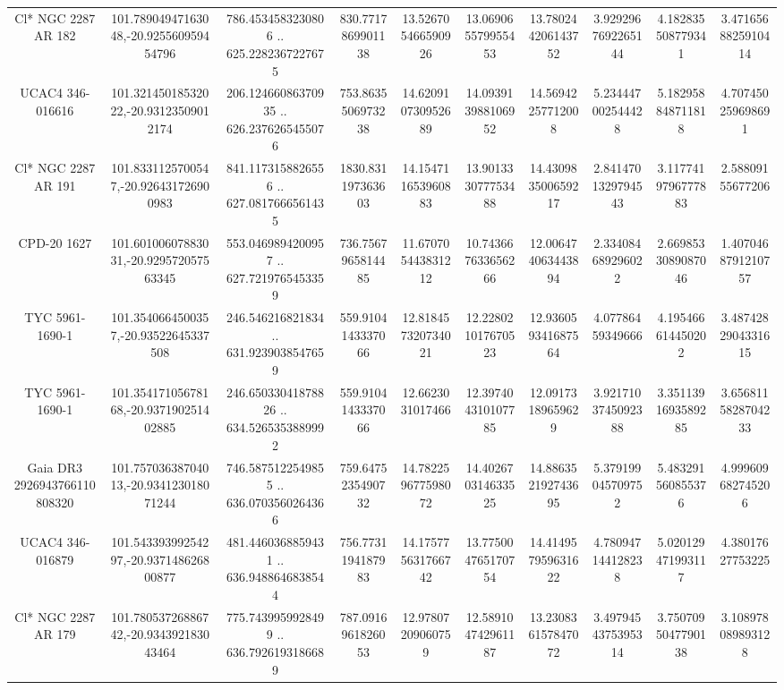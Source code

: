 \begin{table}
\begin{tabular}{cccccccccc}
Cl* NGC 2287     AR     182 & 101.78904947163048,-20.925560959454796 & 786.4534583230806 .. 625.2282367227675 & 830.7717869901138 & 13.526705466590926 & 13.069065579955453 & 13.780244206143752 & 3.9292967692265144 & 4.182835508779341 & 3.4716568825910414 \\
UCAC4 346-016616 & 101.32145018532022,-20.93123509012174 & 206.12466086370935 .. 626.2376265455076 & 753.8635506973238 & 14.620910730952689 & 14.093913988106952 & 14.56942257712008 & 5.234447002544428 & 5.182958848711818 & 4.707450259698691 \\
Cl* NGC 2287     AR     191 & 101.8331125700547,-20.926431726900983 & 841.1173158826556 .. 627.0817666561435 & 1830.831197363603 & 14.154711653960883 & 13.901333077753488 & 14.430983500659217 & 2.8414701329794543 & 3.1177419796777883 & 2.58809155677206 \\
CPD-20  1627 & 101.60100607883031,-20.929572057563345 & 553.0469894200957 .. 627.7219765453359 & 736.7567965814485 & 11.670705443831212 & 10.743667633656266 & 12.006474063443894 & 2.334084689296022 & 2.6698533089087046 & 1.4070468791210757 \\
TYC 5961-1690-1 & 101.3540664500357,-20.93522645337508 & 246.546216821834 .. 631.9239038547659 & 559.9104143337066 & 12.818457320734021 & 12.228021017670523 & 12.936059341687564 & 4.07786459349666 & 4.195466614450202 & 3.4874282904331615 \\
TYC 5961-1690-1 & 101.35417105678168,-20.937190251402885 & 246.65033041878826 .. 634.5265353889992 & 559.9104143337066 & 12.6623031017466 & 12.397404310107785 & 12.09173189659629 & 3.9217103745092388 & 3.3511391693589285 & 3.6568115828704233 \\
Gaia DR3 2926943766110808320 & 101.75703638704013,-20.934123018071244 & 746.5875122549855 .. 636.0703560264366 & 759.6475235490732 & 14.782259677598072 & 14.402670314633525 & 14.886352192743695 & 5.379199045709752 & 5.483291560855376 & 4.999609682745206 \\
UCAC4 346-016879 & 101.54339399254297,-20.937148626800877 & 481.4460368859431 .. 636.9488646838544 & 756.7731194187983 & 14.175775631766742 & 13.775004765170754 & 14.414957959631622 & 4.780947144128238 & 5.020129471993117 & 4.38017627753225 \\
Cl* NGC 2287     AR     179 & 101.78053726886742,-20.934392183043464 & 775.7439959928499 .. 636.7926193186689 & 787.0916961826053 & 12.97807209060759 & 12.589104742961187 & 13.230836157847072 & 3.4979454375395314 & 3.7507095047790138 & 3.108978089893128 \\

\end{tabular}
\end{table}
